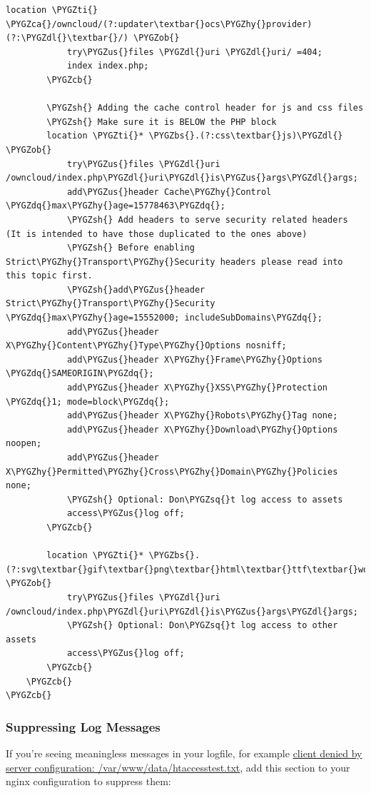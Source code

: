 \documentclass[letterpaper,10pt,english]{sphinxmanual}
\def\PYGZbs{\char`\\}
\def\PYGZus{\char`\_}
\def\PYGZob{\char`\{}
\def\PYGZcb{\char`\}}
\def\PYGZca{\char`\^}
\def\PYGZsh{\char`\#}
\def\PYGZdl{\char`\$}
\def\PYGZhy{\char`\-}
\def\PYGZsq{\char`\'}
\def\PYGZdq{\char`\"}
\def\PYGZti{\char`\~}
\renewcommand\PYGZsq{\textquotesingle}
\begin{document}
\begin{Verbatim}[commandchars=\\\{\}]
        location \PYGZti{} \PYGZca{}/owncloud/(?:updater\textbar{}ocs\PYGZhy{}provider)(?:\PYGZdl{}\textbar{}/) \PYGZob{}
            try\PYGZus{}files \PYGZdl{}uri \PYGZdl{}uri/ =404;
            index index.php;
        \PYGZcb{}

        \PYGZsh{} Adding the cache control header for js and css files
        \PYGZsh{} Make sure it is BELOW the PHP block
        location \PYGZti{}* \PYGZbs{}.(?:css\textbar{}js)\PYGZdl{} \PYGZob{}
            try\PYGZus{}files \PYGZdl{}uri /owncloud/index.php\PYGZdl{}uri\PYGZdl{}is\PYGZus{}args\PYGZdl{}args;
            add\PYGZus{}header Cache\PYGZhy{}Control \PYGZdq{}max\PYGZhy{}age=15778463\PYGZdq{};
            \PYGZsh{} Add headers to serve security related headers  (It is intended to have those duplicated to the ones above)
            \PYGZsh{} Before enabling Strict\PYGZhy{}Transport\PYGZhy{}Security headers please read into this topic first.
            \PYGZsh{}add\PYGZus{}header Strict\PYGZhy{}Transport\PYGZhy{}Security \PYGZdq{}max\PYGZhy{}age=15552000; includeSubDomains\PYGZdq{};
            add\PYGZus{}header X\PYGZhy{}Content\PYGZhy{}Type\PYGZhy{}Options nosniff;
            add\PYGZus{}header X\PYGZhy{}Frame\PYGZhy{}Options \PYGZdq{}SAMEORIGIN\PYGZdq{};
            add\PYGZus{}header X\PYGZhy{}XSS\PYGZhy{}Protection \PYGZdq{}1; mode=block\PYGZdq{};
            add\PYGZus{}header X\PYGZhy{}Robots\PYGZhy{}Tag none;
            add\PYGZus{}header X\PYGZhy{}Download\PYGZhy{}Options noopen;
            add\PYGZus{}header X\PYGZhy{}Permitted\PYGZhy{}Cross\PYGZhy{}Domain\PYGZhy{}Policies none;
            \PYGZsh{} Optional: Don\PYGZsq{}t log access to assets
            access\PYGZus{}log off;
        \PYGZcb{}

        location \PYGZti{}* \PYGZbs{}.(?:svg\textbar{}gif\textbar{}png\textbar{}html\textbar{}ttf\textbar{}woff\textbar{}ico\textbar{}jpg\textbar{}jpeg)\PYGZdl{} \PYGZob{}
            try\PYGZus{}files \PYGZdl{}uri /owncloud/index.php\PYGZdl{}uri\PYGZdl{}is\PYGZus{}args\PYGZdl{}args;
            \PYGZsh{} Optional: Don\PYGZsq{}t log access to other assets
            access\PYGZus{}log off;
        \PYGZcb{}
    \PYGZcb{}
\PYGZcb{}
\end{Verbatim}


\subsubsection{Suppressing Log Messages}
\label{installation/nginx_examples:suppressing-log-messages}
If you're seeing meaningless messages in your logfile, for example \href{https://central.owncloud.org/t/htaccesstest-txt-errors-in-logfiles/831}{client
denied by server configuration: /var/www/data/htaccesstest.txt},
add this section to your nginx configuration to suppress them:
\end{document}
